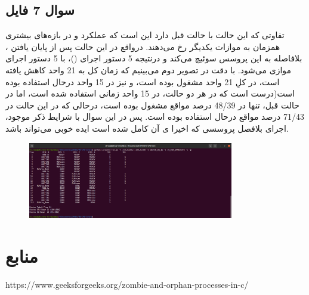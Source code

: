 \documentclass{article}
\begin{document}
\subsection{سوال 7 فایل}
تفاوتی که این حالت با حالت قبل دارد این است که عملکرد  و  در بازه‌های بیشتری همزمان به موازات یکدیگر رخ می‌دهند. درواقع در این حالت پس از پایان یافتن ، بلافاصله به این پروسس سوئیچ می‌کند و درنتیجه 5 دستور اجرای ()، با 5 دستور اجرای  موازی می‌شود. با دقت در تصویر دوم می‌بینیم که زمان کل به 21 واحد کاهش یافته است،  در کلِ 21 واحد مشغول بوده است، و  نیز در 15 واحد درحال استفاده بوده است(درست است که در هر دو حالت،  در 15 واحد زمانی استفاده شده است، اما در حالت قبل،  تنها در 48/39 درصد مواقع مشغول بوده است، درحالی که در این حالت در 71/43 درصد مواقع درحال استفاده بوده است. پس در این سوال با شرایط ذکر موجود، اجرای بلافصل پروسسی که اخیرا ی آن کامل شده است ایده خوبی می‌تواند باشد.
\begin{figure}[H]
    \centering
    \includegraphics[width=0.8\textwidth]{figures/7.2.png}
    \caption{}
    \label{fig:fig1}
\end{figure}


\section*{منابع}
\renewcommand{\section}[2]{}%
\begin{thebibliography}{99} %


\begin{LTRitems}

\resetlatinfont

https://www.geeksforgeeks.org/zombie-and-orphan-processes-in-c/

\end{LTRitems}

\end{thebibliography}
\end{document}
